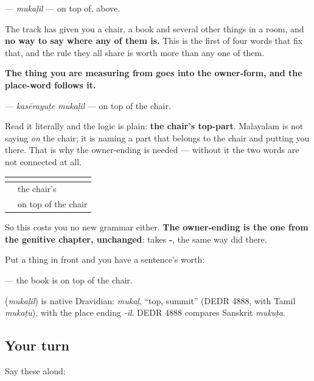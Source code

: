 \begin{grammarlens}[title={Grammar Lens: the owner-ending comes first}]
\textbf{} — \emph{mukaḷil} — on top of, above.

The track has given you a chair, a book and several other things in a room, and \textbf{no way to say where any of them is.} This is the first of four words that fix that, and the rule they all share is worth more than any one of them.

\textbf{The thing you are measuring from goes into the owner-form, and the place-word follows it.}

\textbf{ } — \emph{kasērayuṭe mukaḷil} — on top of the chair.

Read it literally and the logic is plain: \textbf{the chair's top-part}. Malayalam is not saying \emph{on} the chair; it is naming a part that belongs to the chair and putting you there. That is why the owner-ending is needed — without it the two words are not connected at all.

\noindent
\begin{tabularx}{\linewidth}{@{}>{\raggedright\arraybackslash}X>{\raggedright\arraybackslash}X@{}}
\toprule
\textbf{} & \textbf{} \\
\midrule
\textbf{\ml{കസേരയുടെ}} & the chair's \\
\textbf{\ml{കസേരയുടെ} \ml{മുകളിൽ}} & on top of the chair \\
\bottomrule
\end{tabularx}

So this costs you no new grammar either. \textbf{The owner-ending is the one from the genitive chapter, unchanged}: \textbf{} takes \textbf{-}, the same way \textbf{} did there.

Put a thing in front and you have a sentence's worth:

\textbf{  } — the book is on top of the chair.
\end{grammarlens}

\begin{cousinweb}
\textbf{} (\emph{mukaḷil}) is native Dravidian: \emph{mukaḷ}, \textquotedblleft{}top, summit\textquotedblright{} (DEDR 4888, with Tamil \emph{mukaṭu}), with the place ending \emph{-il}. DEDR 4888 compares Sanskrit \emph{mukuṭa}.
\end{cousinweb}

\subsection*{Your turn}
Say these aloud:

